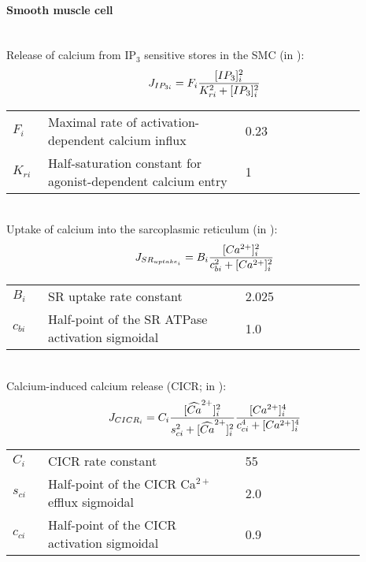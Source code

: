 \paragraph{Smooth muscle cell}~\\
%
Release of calcium from IP$_{3}$ sensitive stores in the SMC (in \uMps):
\begin{equation} \label{eq:IP3i}
J_{IP_{3i}} = F_{i}\frac{[IP_{3}]_{i}^{2}}{K_{ri}^{2}+[IP_{3}]_{i}^{2}}
\end{equation}
%
\begin{table}[h!]
\centering
\begin{tabular}{ p{0.09\linewidth}  >{\footnotesize} p{0.5\linewidth}  >{\footnotesize} p{0.27\linewidth} >{\footnotesize} p{0.03\linewidth} }
\hline
 $F_{i}$      			& Maximal rate of activation-dependent calcium influx			& 0.23 \uMps				& \cite{Koenigsberger2006} \\
$K_{ri}$				& Half-saturation constant for agonist-dependent calcium entry	& 1 \uM					& \cite{Koenigsberger2006} \\
\hline
\end{tabular}
\label{tab:IP3i}
\end{table}
\\
%
Uptake of calcium into the sarcoplasmic reticulum (in \uMs):
\begin{equation} \label{eq:JSRuptakei}
J_{SR_{uptake_{i}}} = B_{i}\frac{[Ca^{2+}]_{i}^{2}}{c_{bi}^{2}+[Ca^{2+}]_{i}^{2}}
\end{equation}
%
\begin{table}[h!]
\centering
\begin{tabular}{ p{0.09\linewidth}  >{\footnotesize} p{0.5\linewidth}  >{\footnotesize} p{0.27\linewidth} >{\footnotesize} p{0.03\linewidth} }
\hline
$B_{i}$      			& SR uptake rate constant							& 2.025 \uMs				& \cite{Koenigsberger2006} \\
$c_{bi}$				& Half-point of the SR ATPase activation sigmoidal 	& 1.0 \uM					& \cite{Koenigsberger2006} \\
\hline
\end{tabular}
\label{tab:JSRuptakei}
\end{table}
\\
%
Calcium-induced calcium release (CICR; in \uMs):
\begin{equation} \label{eq:JCICRi}
J_{CICR_{i}} = C_{i}\frac{[\widehat{Ca}^{2+}]_{i}^{2}}{s_{ci}^{2}+[\widehat{Ca}^{2+}]_{i}^{2}}    \frac{[Ca^{2+}]_{i}^{4}}{c_{ci}^{4}+[Ca^{2+}]_{i}^{4}}
\end{equation}
%
\begin{table}[h!]
\centering
\begin{tabular}{ p{0.09\linewidth}  >{\footnotesize} p{0.5\linewidth}  >{\footnotesize} p{0.27\linewidth} >{\footnotesize} p{0.03\linewidth} }
\hline
$C_{i}$      			& CICR rate constant									& 55 \uMs		& \cite{Koenigsberger2006} \\
$s_{ci}$				& Half-point of the CICR Ca$^{2+}$ efflux sigmoidal			& 2.0 \uM		& \cite{Koenigsberger2006} \\
$c_{ci}$				& Half-point of the CICR activation sigmoidal			& 0.9 \uM		& \cite{Koenigsberger2006} \\
\hline
\end{tabular}
\label{tab:JCICRi}
\end{table}
